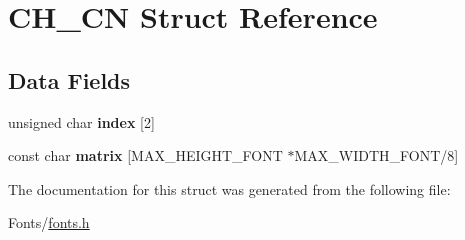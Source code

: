 \hypertarget{struct_c_h___c_n}{}\section{C\+H\+\_\+\+CN Struct Reference}
\label{struct_c_h___c_n}
\subsection*{Data Fields}
\begin{DoxyCompactItemize}
\item 
\mbox{\label{struct_c_h___c_n_af7de93063def61152c245b6b2919ae71}} 
unsigned char {\bfseries index} \mbox{[}2\mbox{]}
\item 
\mbox{\label{struct_c_h___c_n_acd0271eb7794fd3c14691ef040838477}} 
const char {\bfseries matrix} \mbox{[}M\+A\+X\+\_\+\+H\+E\+I\+G\+H\+T\+\_\+\+F\+O\+NT $\ast$M\+A\+X\+\_\+\+W\+I\+D\+T\+H\+\_\+\+F\+O\+NT/8\mbox{]}
\end{DoxyCompactItemize}


The documentation for this struct was generated from the following file\+:\begin{DoxyCompactItemize}
\item 
Fonts/\mbox{\hyperlink{fonts_8h}{fonts.\+h}}\end{DoxyCompactItemize}
